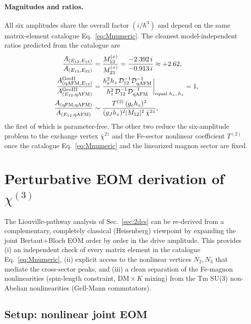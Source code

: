 \documentclass[reprint,amsmath,amssymb,aps,prb,longbibliography]{revtex4-2}
\begin{document}
\paragraph{Magnitudes and ratios.} All six amplitudes share the
overall factor $(i/\hbar^3)$ and depend on the same matrix-element
catalogue Eq.~\eqref{eq:Mnumeric}. The cleanest model-independent ratios
predicted from the catalogue are
\begin{equation}
\begin{aligned}
\frac{A_{(E_{12},E_{13})}}{A_{(E_{12},E_{23})}} &= \frac{M_{13}^{(x)}}{M_{23}^{(x)}}=\frac{-2.392\,i}{-0.913\,i}\approx +2.62,\\
\frac{A_{(\mathrm{qAFM},E_{12})}^{\rm Geo II}}{A_{(E_{12},\mathrm{qAFM})}^{\rm Geo III}} &= \frac{h_x^2 h_z\,\mathcal D_{12}^{-1}\mathcal D_{\rm qAFM}^{-1}}
{h_z^2\,\mathcal D_{12}^{-1}\mathcal D_{\rm qAFM}^{-1}}\biggr|_{\text{equal $h_x,h_z$}}=1,\\
\frac{A_{(\mathrm{qFM},\mathrm{qAFM})}}{A_{(E_{12},\mathrm{qAFM})}} &\sim
\frac{T^{(2)}\,(g_e h_z)^2}{(g_J h_z)^2 |M_{12}|^2\,\bar\chi^{2z}},
\end{aligned}
\label{eq:peakratios}
\end{equation}
the first of which is parameter-free. The other two reduce the
six-amplitude problem to the exchange vertex $\bar\chi^{2z}$ and the
Fe-sector nonlinear coefficient $T^{(2)}$ once the catalogue
Eq.~\eqref{eq:Mnumeric} and the linearized magnon sector are fixed.

\section{Perturbative EOM derivation of \texorpdfstring{$\chi^{(3)}$}{chi(3)}}
\label{sec:EOMexpansion}

The Liouville-pathway analysis of Sec.~\ref{sec:2dcs} can be re-derived
from a complementary, completely classical (Heisenberg) viewpoint by
expanding the joint Bertaut+Bloch EOM order by order in the drive
amplitude. This provides (i) an independent check of every matrix
element in the catalogue Eq.~\eqref{eq:Mnumeric}, (ii) explicit access
to the nonlinear vertices $N_2,N_3$ that mediate the cross-sector
peaks, and (iii) a clean separation of the Fe-magnon nonlinearities
(spin-length constraint, DM\,$\times$\,$K$ mixing) from the Tm SU(3)
non-Abelian nonlinearities (Gell-Mann commutators).

\subsection{Setup: nonlinear joint EOM}
\label{sec:EOMsetup}
\end{document}
